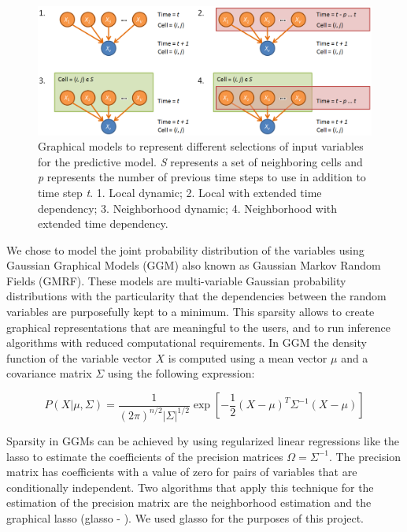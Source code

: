 \documentclass{article}
\begin{document}
\begin{center}
\begin{figure}
\includegraphics[width=0.9\columnwidth]{images/plate_models.png}
\caption{Graphical models to represent different
selections of input variables for the predictive model. \textit{S} represents
a set of neighboring cells and \textit{p} represents the number of previous
time steps to use in addition to time step \textit{t}. 1.
Local dynamic; 2. Local with extended time dependency; 3.
Neighborhood dynamic; 4. Neighborhood with extended time
dependency.}\label{fig:plate_models}
\end{figure}
\end{center}

We chose to model the joint probability distribution of the variables using
Gaussian Graphical Models (GGM) also known as Gaussian Markov Random Fields
(GMRF). These models are multi-variable Gaussian probability distributions with
the particularity that the dependencies between the random variables are
purposefully kept to a minimum. This sparsity allows to create graphical
representations that are meaningful to the users, and to run inference
algorithms with reduced computational requirements. In GGM the density function
of the variable vector $X$ is computed using a mean vector $\mu$ and a
covariance matrix $\Sigma$ using the following expression:

\begin{equation}
\label{eq:gaussian}
P(X|\mu,\Sigma) =
\frac{1}{(2\pi)^{n/2}\vert\Sigma\vert^{1/2}}\exp[-\frac{1}{2}(X - \mu)^T\Sigma^{-1}(X - \mu)]
\end{equation}

Sparsity in GGMs can be achieved by using regularized linear regressions like
the lasso \cite{tibshirani1996} to estimate the coefficients of the precision
matrices $\Omega=\Sigma^{-1}$. The precision matrix has coefficients with a
value of zero for pairs of variables that are conditionally independent. Two
algorithms that apply this technique for the estimation of the precision matrix
are the neighborhood estimation \cite{meinshausen2006} and the graphical lasso
(glasso - \cite{Friedman2008}). We used glasso for the purposes of this project.
\end{document}
